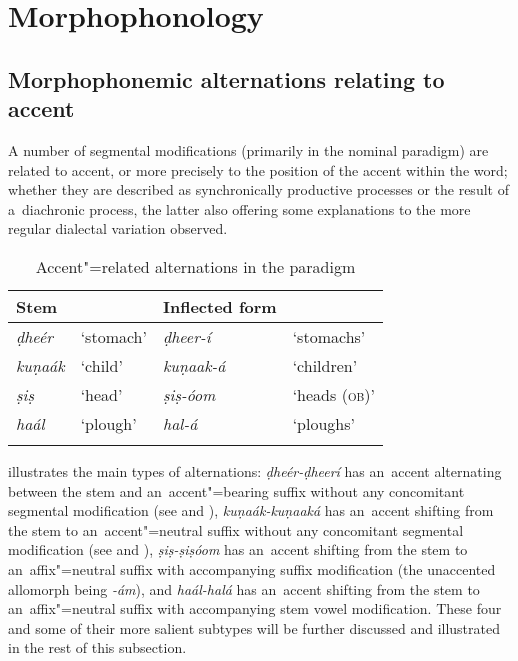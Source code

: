 \section[Morphophonology]{Morphophonology{\protect\footnotemark}}
\label{sec:3-5}


\subsection{Morphophonemic alternations relating to accent}
\label{subsec:3-5-1}

A number of segmental modifications (primarily in the nominal paradigm) are related to accent, or more precisely to the position of the accent within the word; whether they are described as synchronically productive processes or the result of a~diachronic process, the latter also offering some explanations to the more regular dialectal variation observed. 


\begin{table}[ht]
\caption{ Accent"=related alternations in the paradigm}
\begin{tabularx}{\textwidth}{ l@{\hspace{30pt}} Q Q Q }
\lsptoprule
Stem &
&
Inflected form &
\\\hline
\textit{ḍheér} &
`stomach' &
\textit{ḍheer-í} &
`stomachs'\\
\textit{kuṇaák} &
`child' &
\textit{kuṇaak-á} &
`children'\\
\textit{ṣiṣ} &
`head' &
\textit{ṣiṣ-óom} &
`heads (\textsc{ob)}'\\
\textit{haál} &
`plough' &
\textit{hal-á} &
`ploughs'\\\lspbottomrule
\end{tabularx}
\label{tab:3-7}
\end{table}


 illustrates the main types of alternations: \textit{ḍheér-ḍheerí} has an~accent alternating between the stem and an~accent"=bearing suffix without any concomitant segmental modification (see  and ), \textit{kuṇaák-kuṇaaká} has an~accent shifting from the stem to an~accent"=neutral suffix without any concomitant segmental modification (see  and ), \textit{ṣiṣ-ṣiṣóom} has an~accent shifting from the stem to an~affix"=neutral suffix with accompanying suffix modification (the unaccented allomorph being \textit{-ám}), and \textit{haál-halá} has an~accent shifting from the stem to an~affix"=neutral suffix with accompanying stem vowel modification. These four and some of their more salient subtypes will be further discussed and illustrated in the rest of this subsection.


